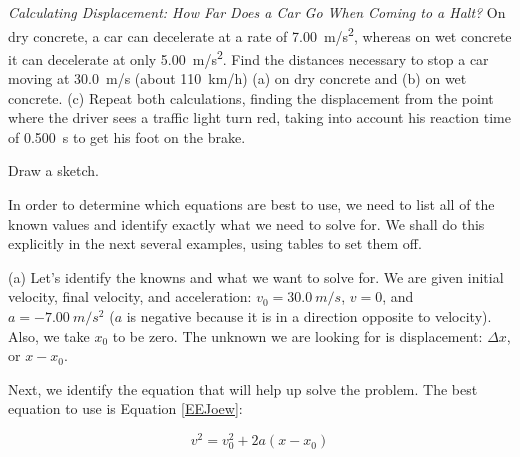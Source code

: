 \documentclass[dvipsnames]{article}
\begin{document}
\begin{example}
    \textit{Calculating Displacement: How Far Does a Car Go When Coming to a Halt?} On dry concrete, a car can decelerate at a rate of \SI{7.00}{m/s^2}, whereas on wet concrete it can decelerate at only \SI{5.00}{m/s^2}. Find the distances necessary to stop a car moving at \SI{30.0}{m/s} (about \SI{110}{km/h}) (a) on dry concrete and (b) on wet concrete. (c) Repeat both calculations, finding the displacement from the point where the driver sees a traffic light turn red, taking into account his reaction time of \SI{0.500}{s} to get his foot on the brake.
\end{example}

\Solution Draw a sketch.

\begin{center}
\end{center}

In order to determine which equations are best to use, we need to list all of the known values and identify exactly what we need to solve for. We shall do this explicitly in the next several examples, using tables to set them off.

\vspace{1em}

(a) Let's identify the knowns and what we want to solve for. We are given initial velocity, final velocity, and acceleration: $v_0 = \SI{30.0}{m/s}$, $v= 0$, and $a = \SI{-7.00}{m/s^2}$ ($a$ is negative because it is in a direction opposite to velocity). Also, we take $x_0$ to be zero. The unknown we are looking for is displacement: $\Delta x$, or $x-x_0$.

\vspace{1em}

Next, we identify the equation that will help up solve the problem. The best equation to use is Equation \eqref{EEJoew}:

\begin{equation*}
    v^2 = v_0^2 + 2a(x-x_0)
\end{equation*}
\end{document}
